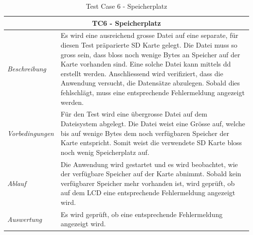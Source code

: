 \documentclass[
    10pt,
    a4paper,
]{scrartcl}
\begin{document}
\begin{table}
    \centering
    \begin{tabularx}{\columnwidth}{lX}
        \multicolumn{2}{c}{\textbf{TC6 - Speicherplatz}} \\\toprule
        \textit{Beschreibung} & Es wird eine ausreichend grosse Datei auf eine separate,
            für diesen Test präparierte SD Karte gelegt. Die Datei muss so gross sein,
            dass bloss noch wenige Bytes an Speicher auf der Karte vorhanden sind. Eine
            solche Datei kann mittels dd erstellt werden. Anschliessend wird verifiziert,
            dass die Anwendung versucht, die Datensätze abzulegen. Sobald dies
            fehlschlägt, muss eine entsprechende Fehlermeldung angezeigt werden.
            \\\midrule
        \textit{Vorbedingungen} & Für den Test wird eine übergrosse Datei auf dem
            Dateisystem abgelegt. Die Datei weist eine Grösse auf, welche bis auf wenige
            Bytes dem noch verfügbaren Speicher der Karte entspricht. Somit weist die
            verwendete SD Karte bloss noch wenig Speicherplatz auf. \\\midrule
        \textit{Ablauf} & Die Anwendung wird gestartet und es wird beobachtet, wie der
            verfügbare Speicher auf der Karte abnimmt. Sobald kein verfügbarer Speicher
            mehr vorhanden ist, wird geprüft, ob auf dem LCD eine entsprechende
            Fehlermeldung angezeigt wird. \\\midrule
        \textit{Auswertung} & Es wird geprüft, ob eine entsprechende Fehlermeldung
            angezeigt wird. \\\bottomrule
    \end{tabularx}
    \caption{Test Case 6 - Speicherplatz}
    \label{tab:tc6}
\end{table}

\FloatBarrier

\listoftables
\listoffigures



\end{document}
